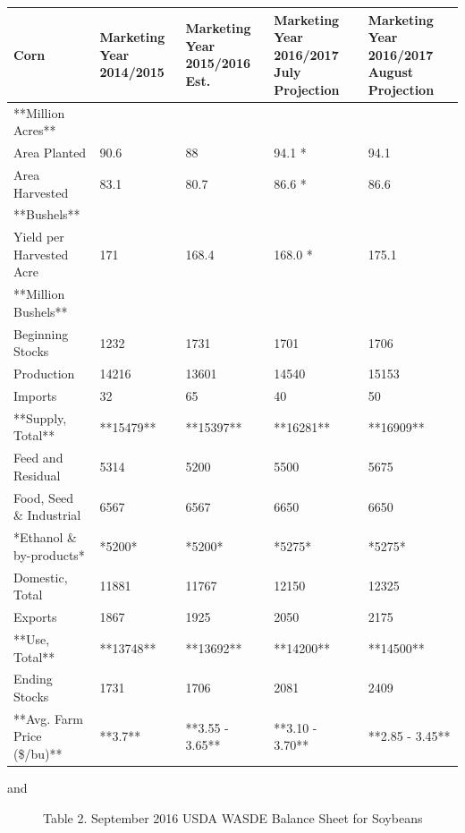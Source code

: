 \documentclass[]{book}
\theoremstyle{definition}
\theoremstyle{definition}
\theoremstyle{remark}
\begin{document}
\begin{tabular}{l|l|l|l|l}
\hline
Corn & Marketing Year 2014/2015 & Marketing Year 2015/2016 Est. & Marketing Year 2016/2017 July Projection & Marketing Year 2016/2017 August Projection\\
\hline
**Million Acres** &  &  &  & \\
\hline
Area Planted & 90.6 & 88 & 94.1 * & 94.1\\
\hline
Area Harvested & 83.1 & 80.7 & 86.6 * & 86.6\\
\hline
**Bushels** &  &  &  & \\
\hline
Yield per Harvested Acre & 171 & 168.4 & 168.0 * & 175.1\\
\hline
**Million Bushels** &  &  &  & \\
\hline
Beginning Stocks & 1232 & 1731 & 1701 & 1706\\
\hline
Production & 14216 & 13601 & 14540 & 15153\\
\hline
Imports & 32 & 65 & 40 & 50\\
\hline
**Supply, Total** & **15479** & **15397** & **16281** & **16909**\\
\hline
Feed and Residual & 5314 & 5200 & 5500 & 5675\\
\hline
Food, Seed \& Industrial & 6567 & 6567 & 6650 & 6650\\
\hline
*Ethanol \& by-products* & *5200* & *5200* & *5275* & *5275*\\
\hline
Domestic, Total & 11881 & 11767 & 12150 & 12325\\
\hline
Exports & 1867 & 1925 & 2050 & 2175\\
\hline
**Use, Total** & **13748** & **13692** & **14200** & **14500**\\
\hline
Ending Stocks & 1731 & 1706 & 2081 & 2409\\
\hline
**Avg. Farm Price (\$/bu)** & **3.7** & **3.55 - 3.65** & **3.10 - 3.70** & **2.85 - 3.45**\\
\hline
\end{tabular}

\begin{description}
\item[and]
Table 2. September 2016 USDA WASDE Balance Sheet for Soybeans
\end{description}
\end{document}
